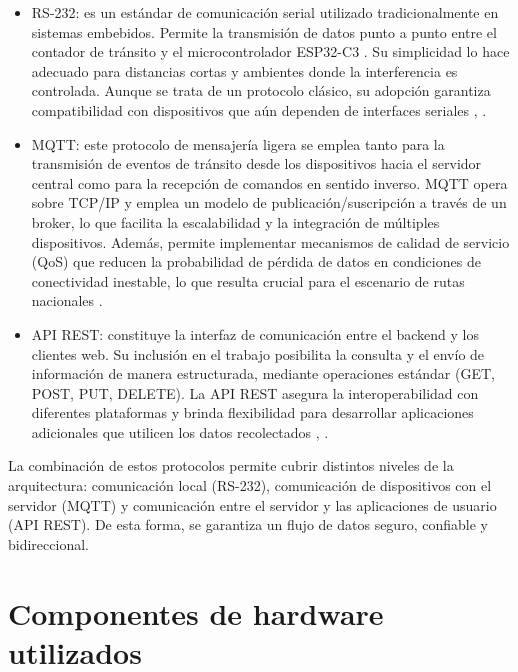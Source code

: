 \begin{itemize}
	\item RS-232: es un estándar de comunicación serial utilizado tradicionalmente en sistemas embebidos. Permite la transmisión de datos punto a punto entre el contador de tránsito y el microcontrolador ESP32-C3 \cite{esp32c3}. Su simplicidad lo hace adecuado para distancias cortas y ambientes donde la interferencia es controlada. Aunque se trata de un protocolo clásico, su adopción garantiza compatibilidad con dispositivos que aún dependen de interfaces seriales \cite{analogRS232},  \cite{tiRS232}.
	
	\item MQTT: este protocolo de mensajería ligera se emplea tanto para la transmisión de eventos de tránsito desde los dispositivos hacia el servidor central como para la recepción de comandos en sentido inverso. MQTT opera sobre TCP/IP \cite{comerTCPIP} y emplea un modelo de publicación/suscripción a través de un broker, lo que facilita la escalabilidad y la integración de múltiples dispositivos. Además, permite implementar mecanismos de calidad de servicio (QoS) que reducen la probabilidad de pérdida de datos en condiciones de conectividad inestable, lo que resulta crucial para el escenario de rutas nacionales \cite{mqttSpec}.
	
	\item API REST: constituye la interfaz de comunicación entre el backend y los clientes web. Su inclusión en el trabajo posibilita la consulta y el envío de información de manera estructurada, mediante operaciones estándar (GET, POST, PUT, DELETE). La API REST asegura la interoperabilidad con diferentes plataformas y brinda flexibilidad para desarrollar aplicaciones adicionales que utilicen los datos recolectados \cite{ibmRest}, \cite{microsoftApiDesign} .
		
\end{itemize}

La combinación de estos protocolos permite cubrir distintos niveles de la arquitectura: comunicación local (RS-232), comunicación de dispositivos con el servidor (MQTT) y comunicación entre el servidor y las aplicaciones de usuario (API REST). De esta forma, se garantiza un flujo de datos seguro, confiable y bidireccional.




\section{Componentes de hardware utilizados}


